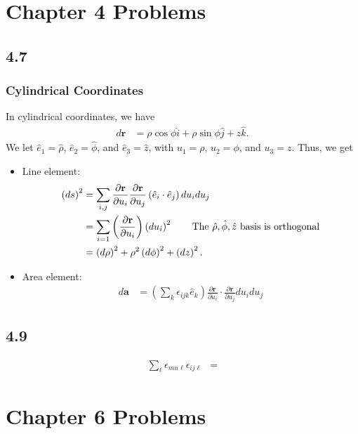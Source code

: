 \documentclass[10pt]{mypackage}
\begin{document}
\RaggedRight

\section{Chapter 4 Problems}%
\subsection{4.7}%
\subsubsection{Cylindrical Coordinates}%
In cylindrical coordinates, we have
\begin{align*}
  d\mathbf{r} &= \rho \cos \phi \hat{i} + \rho \sin\phi \hat{j} + z\hat{k}.
\end{align*}
We let $\hat{e}_1 = \hat{\rho}$, $\hat{e}_2 = \hat{\phi}$, and $\hat{e}_3 = \hat{z}$, with $u_1 = \rho$, $u_2 = \phi$, and $u_3 = z$. Thus, we get
\begin{itemize}
  \item Line element:
    \begin{align*}
      \left(ds\right)^2 &= \sum_{i,j} \frac{\partial \mathbf{r}}{\partial u_i} \frac{\partial \mathbf{r}}{\partial u_j}\left(\hat{e}_i \cdot \hat{e}_j\right) du_idu_j\\
                        &= \sum_{i=1}\left(\frac{\partial \mathbf{r}}{\partial u_i}\right) \left(du_i\right)^2\tag*{The $\hat{\rho},\hat{\phi},\hat z$ basis is orthogonal}\\
                        &= \left(d\rho\right)^2 + \rho^2 \left(d\phi\right)^2 + \left(dz\right)^2.
    \end{align*}
  \item Area element:
    \begin{align*}
      d\mathbf{a} &= \left(\sum_{k}\epsilon_{ijk}\hat{e}_k\right)\frac{\partial \mathbf{r}}{\partial u_i}\cdot\frac{\partial \mathbf{r}}{\partial u_j} du_i du_j
    \end{align*}
\end{itemize}
\subsection{4.9}%
\begin{align*}
  \sum_{\ell}\epsilon_{mn\ell}\epsilon_{ij\ell} &= 
\end{align*}
\section{Chapter 6 Problems}%
\end{document}
